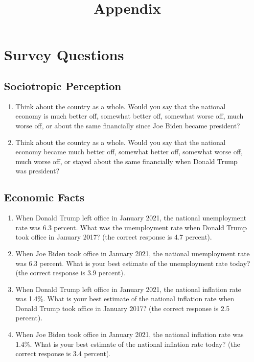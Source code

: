 \documentclass{article}\usepackage[]{graphicx}\usepackage[]{xcolor}
\title{Appendix}
\date{}
\begin{document}
\maketitle

\tableofcontents
\newpage
\listoftables
\listoffigures
\newpage


\section{Survey Questions}

\subsection{Sociotropic Perception}
\begin{enumerate}
\item Think about the country as a whole. Would you say that the national economy is much better off, somewhat better off, somewhat worse off, much worse off, or about the same financially since Joe Biden became president?


\item Think about the country as a whole. Would you say that the national economy became much better off, somewhat better off, somewhat worse off, much worse off, or stayed about the same financially when Donald Trump was president?
\end{enumerate}

\subsection{Economic Facts}
\begin{enumerate}

\item When Donald Trump left office in January 2021, the national unemployment rate was 6.3 percent. What was the unemployment rate when Donald Trump took office in January 2017? (the correct response is 4.7 percent).
\item When Joe Biden took office in January 2021, the national unemployment rate was 6.3 percent. What is your best estimate of the unemployment rate today? (the correct response is 3.9 percent).
\item When Donald Trump left office in January 2021, the national inflation 
rate was 1.4\%. What is your best estimate of the national inflation rate when Donald 
Trump took office in January 2017? (the correct response is 2.5 percent).
\item When Joe Biden took office in January 2021, the national inflation rate 
was 1.4\%. What is your best estimate of the national inflation rate today? (the correct response is 3.4 percent).
\end{enumerate}
\end{document}
